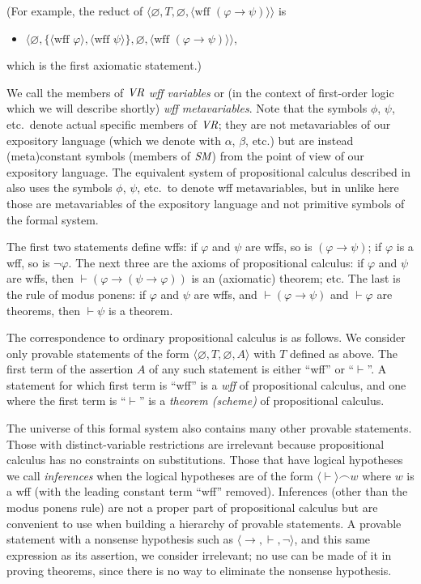 (For example, the reduct of $\langle\varnothing,T,\varnothing,
               \langle \mbox{wff\ }(\varphi\to\psi)\rangle\rangle$
is
\begin{itemize}
\item[] $\langle\varnothing,
\{\langle \mbox{wff\ } \varphi\rangle,
             \langle \mbox{wff\ } \psi\rangle\},
             \varnothing,
               \langle \mbox{wff\ }(\varphi\to\psi)\rangle\rangle$,
\end{itemize}
which is the first axiomatic statement.)

We call the members of $\mbox{\em VR}$ {\em wff variables} or (in the context
of first-order logic which we will describe shortly) {\em wff metavariables}.
Note that the symbols $\phi$, $\psi$, etc.\ denote actual specific members of
$\mbox{\em VR}$; they are not metavariables of our expository language (which
we denote with $\alpha$, $\beta$, etc.) but are instead (meta)constant symbols
(members of $\mbox{\em SM}$) from the point of view of our expository
language.  The equivalent system of propositional calculus described in
\cite{Tarski1965} also uses the symbols $\phi$, $\psi$, etc.\ to denote wff
metavariables, but in \cite{Tarski1965} unlike here those are metavariables of
the expository language and not primitive symbols of the formal system.

The first two statements define wffs: if $\varphi$ and $\psi$ are wffs, so is
$(\varphi \to \psi)$; if $\varphi$ is a wff, so is $\lnot\varphi$. The next
three are the axioms of propositional calculus: if $\varphi$ and $\psi$ are
wffs, then $\vdash (\varphi \to (\psi \to \varphi))$ is an (axiomatic)
theorem; etc. The
last is the rule of modus ponens: if $\varphi$ and $\psi$ are wffs, and
$\vdash (\varphi\to\psi)$ and $\vdash \varphi$ are theorems, then $\vdash
\psi$ is a theorem.

The correspondence to ordinary propositional calculus is as follows.  We
consider only provable statements of the form $\langle\varnothing,
T,\varnothing,A\rangle$ with $T$ defined as above.  The first term of the
assertion $A$ of any such statement is either ``wff'' or ``$\vdash$''.  A
statement for which first term is ``wff'' is a {\em wff} of propositional
calculus, and one where the first term is ``$\vdash$'' is a {\em
theorem (scheme)} of propositional calculus.

The universe of this formal system also contains many other provable
statements.  Those with distinct-variable restrictions are irrelevant because
propositional calculus has no constraints on substitutions.  Those that have
logical hypotheses we call {\em inferences} when
the logical hypotheses are of the form
$\langle\vdash\rangle\frown w$ where $w$ is a wff (with the leading constant
term ``wff'' removed).  Inferences (other than the modus ponens rule) are not a
proper part of propositional calculus but are convenient to use when building a
hierarchy of provable statements.  A provable statement with a nonsense
hypothesis such as $\langle \to,\vdash,\lnot\rangle$, and this same expression
as its assertion, we consider irrelevant; no use can be made of it in
proving theorems, since there is no way to eliminate the nonsense hypothesis.

